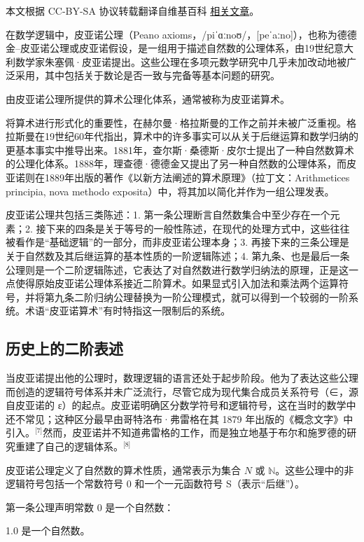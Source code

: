 
本文根据 CC-BY-SA 协议转载翻译自维基百科 \href{https://en.wikipedia.org/wiki/Peano_axioms}{相关文章}。

在数学逻辑中，皮亚诺公理（Peano axioms，/piˈɑːnoʊ/，[peˈaːno]），也称为德德金–皮亚诺公理或皮亚诺假设，是一组用于描述自然数的公理体系，由19世纪意大利数学家朱塞佩·皮亚诺提出。这些公理在多项元数学研究中几乎未加改动地被广泛采用，其中包括关于数论是否一致与完备等基本问题的研究。

由皮亚诺公理所提供的算术公理化体系，通常被称为皮亚诺算术。

将算术进行形式化的重要性，在赫尔曼·格拉斯曼的工作之前并未被广泛重视。格拉斯曼在19世纪60年代指出，算术中的许多事实可以从关于后继运算和数学归纳的更基本事实中推导出来。1881年，查尔斯·桑德斯·皮尔士提出了一种自然数算术的公理化体系。1888年，理查德·德德金又提出了另一种自然数的公理体系，而皮亚诺则在1889年出版的著作《以新方法阐述的算术原理》（拉丁文：Arithmetices principia, nova methodo exposita）中，将其加以简化并作为一组公理发表。

皮亚诺公理共包括三类陈述：1. 第一条公理断言自然数集合中至少存在一个元素；2. 接下来的四条是关于等号的一般性陈述，在现代的处理方式中，这些往往被看作是“基础逻辑”的一部分，而非皮亚诺公理本身；3. 再接下来的三条公理是关于自然数及其后继运算的基本性质的一阶逻辑陈述；4. 第九条、也是最后一条公理则是一个二阶逻辑陈述，它表达了对自然数进行数学归纳法的原理，正是这一点使得原始皮亚诺公理体系接近二阶算术。如果显式引入加法和乘法两个运算符号，并将第九条二阶归纳公理替换为一阶公理模式，就可以得到一个较弱的一阶系统。术语“皮亚诺算术”有时特指这一限制后的系统。
\subsection{历史上的二阶表述}
当皮亚诺提出他的公理时，数理逻辑的语言还处于起步阶段。他为了表达这些公理而创造的逻辑符号体系并未广泛流行，尽管它成为现代集合成员关系符号（∈，源自皮亚诺的 ε）的起点。皮亚诺明确区分数学符号和逻辑符号，这在当时的数学中还不常见；这种区分最早由哥特洛布·弗雷格在其 1879 年出版的《概念文字》中引入。\(^\text{[7]}\)然而，皮亚诺并不知道弗雷格的工作，而是独立地基于布尔和施罗德的研究重建了自己的逻辑体系。\(^\text{[8]}\)

皮亚诺公理定义了自然数的算术性质，通常表示为集合 $N$ 或 $\mathbb{N}$。这些公理中的非逻辑符号包括一个常数符号 0 和一个一元函数符号 S（表示“后继”）。

第一条公理声明常数 0 是一个自然数：

1.0 是一个自然数。

